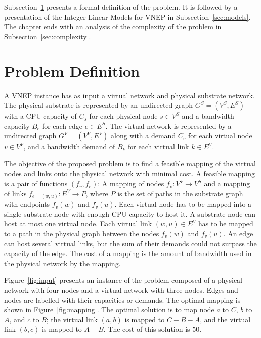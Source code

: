 Subsection~\ref{sec:def} presents a formal definition of the problem. It is followed by a presentation of the Integer Linear Models for VNEP in Subsection~\ref{sec:models}. The chapter ends with an analysis of the complexity of the problem in Subsection~\ref{sec:complexity}.

\section{Problem Definition}
\label{sec:def}

A VNEP instance has as input a virtual network and physical substrate network. The physical substrate is represented by an undirected graph $G^S = (V^S,E^S)$ with a CPU capacity of $C_{s}$ for each physical node $s \in V^S$ and a bandwidth capacity $B_{e}$ for each edge $e \in E^S$. The virtual network is represented by a undirected graph $G^V = (V^V,E^V)$ along with a demand $C_{v}$ for each virtual node $v \in V^V$, and a bandwidth demand of $B_{k}$ for each virtual link $k \in E^V$. 

The objective of the proposed problem is to find a feasible mapping of the virtual nodes and links onto the physical network with minimal cost. 
A feasible mapping is a pair of functions $(f_v, f_e)$: A mapping of nodes $f_v: V^V \rightarrow V^S$ and a mapping of links $f_{e=(w,u)}: E^V \rightarrow P$, where $P$ is the set of paths in the substrate graph with endpoints $f_v(w)$ and $f_v(u)$.
Each virtual node has to be mapped into a single substrate node with enough CPU capacity to host it. A substrate node can host at most one virtual node. Each virtual link $(w,u) \in E^V$ has to be mapped to a path in the physical graph between the nodes $f_v(w)$ and $f_v(u)$. An edge can host several virtual links, but the sum of their demands could not surpass the capacity of the edge. The cost of a mapping is the amount of bandwidth used in the physical network by the mapping.

Figure~\ref{fig:input} presents an instance of the problem composed of a physical network with four nodes and a virtual network with three nodes. 
Edges and nodes are labelled with their capacities or demands. 
The optimal mapping is shown in Figure~\ref{fig:mapping}. 
The optimal solution is to map node $a$ to $C$, $b$ to $A$, and $c$ to $B$;
the virtual link  $(a,b)$ is mapped to $C-B-A$, and the virtual link $(b,c)$ is mapped to $A-B$. The cost of this solution is $50$.


